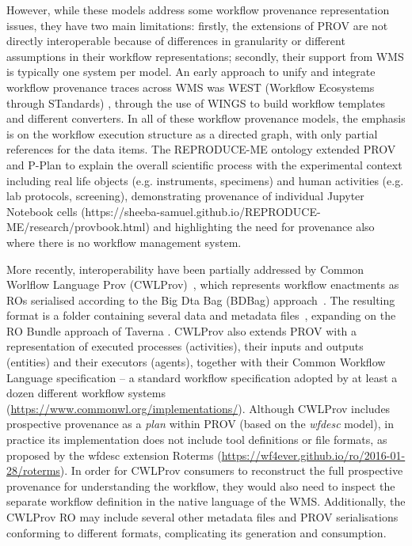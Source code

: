 \documentclass[10pt,letterpaper]{article}
\begin{document}
However, while these models address some workflow provenance representation issues, they have two main limitations: firstly, the extensions of PROV are not directly interoperable because of differences in granularity or different assumptions in their workflow representations; secondly, their support from WMS is typically one system per model.  An early approach to unify and integrate workflow provenance traces across WMS was WEST (Workflow Ecosystems through STandards) \cite{Garijo 2014}, through the use of WINGS \cite{Gil 2011} to build workflow templates and different converters. In all of these workflow provenance models, the emphasis is on the workflow execution structure as a directed graph, with only partial references for the data items. 
The REPRODUCE-ME ontology \cite{Samuel 2022} extended PROV and P-Plan to explain the overall scientific process with the experimental context including real life objects (e.g. instruments, specimens) and human activities (e.g. lab protocols, screening), demonstrating provenance of individual Jupyter Notebook cells (https://sheeba-samuel.github.io/REPRODUCE-ME/research/provbook.html) and highlighting the need for provenance also where there is no workflow management system. 

More recently, interoperability have been partially addressed by Common Worlflow Language Prov (CWLProv)~\cite{Khan 2019}, which represents workflow enactments as ROs serialised according to the Big Dta Bag (BDBag) approach~\cite{Chard 2016}.
The resulting format is a folder containing several data and metadata files~\cite{Soiland-Reyes 2018}, expanding on the RO Bundle approach of Taverna \cite{Soiland-Reyes 2016}.
CWLProv also extends PROV with a representation of executed processes (activities), their inputs and outputs (entities) and their executors (agents), together with their Common Workflow Language specification
\cite{Crusoe 2022} -- a standard workflow specification adopted by at least a dozen different workflow systems (\url{https://www.commonwl.org/implementations/}). Although CWLProv includes prospective provenance as a \emph{plan}
within PROV (based on the \emph{wfdesc} model), in practice its implementation does not include tool definitions or file formats, as proposed by the wfdesc extension Roterms (\url{https://wf4ever.github.io/ro/2016-01-28/roterms}).
In order for CWLProv consumers to reconstruct the full prospective provenance for understanding the workflow, they would also need to inspect the separate workflow definition in the native language of the WMS.
Additionally, the CWLProv RO may include several other metadata files and PROV serialisations conforming to different formats, complicating its generation and consumption.
\end{document}
